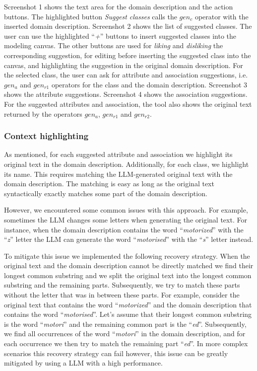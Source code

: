 Screenshot 1 shows the text area for the domain description and the action buttons. The highlighted button \textit{Suggest classes} calls the $gen_c$ operator with the inserted domain description. Screenshot 2 shows the list of suggested classes. The user can use the highlighted ``\textit{+}'' buttons to insert suggested classes into the modeling canvas. The other buttons are used for \textit{liking} and \textit{disliking} the corresponding suggestion, for editing before inserting the suggested class into the canvas, and highlighting the suggestion in the original domain description. For the selected class, the user can ask for attribute and association suggestions, i.e. $gen_a$ and $gen_{r1}$ operators for the class and the domain description. Screenshot 3 shows the attribute suggestions. Screenshot 4 shows the association suggestions. For the suggested attributes and association, the tool also shows the original text returned by the operators $gen_a$, $gen_{r1}$ and $gen_{r2}$.


\subsubsection{Context highlighting}
\label{sec:context_highlighting}

As mentioned, for each suggested attribute and association we highlight its original text in the domain description. Additionally, for each class, we highlight its name. This requires matching the LLM-generated original text with the domain description. The matching is easy as long as the original text syntactically exactly matches some part of the domain description.

However, we encountered some common issues with this approach. For example, sometimes the LLM changes some letters when generating the original text. For instance, when the domain description contains the word ``\textit{motorized}'' with the ``\textit{z}'' letter the LLM can generate the word ``\textit{motorised}'' with the ``\textit{s}'' letter instead.

To mitigate this issue we implemented the following recovery strategy. When the original text and the domain description cannot be directly matched we find their longest common substring and we split the original text into the longest common substring and the remaining parts. Subsequently, we try to match these parts without the letter that was in between these parts. For example, consider the original text that contains the word ``\textit{motorized}'' and the domain description that contains the word ``\textit{motorised}''. Let's assume that their longest common substring is the word ``\textit{motori}'' and the remaining common part is the ``{\textit{ed}}''. Subsequently, we find all occurrences of the word ``\textit{motori}'' in the domain description, and for each occurrence we then try to match the remaining part ``\textit{ed}''. In more complex scenarios this recovery strategy can fail however, this issue can be greatly mitigated by using a LLM with a high performance.



